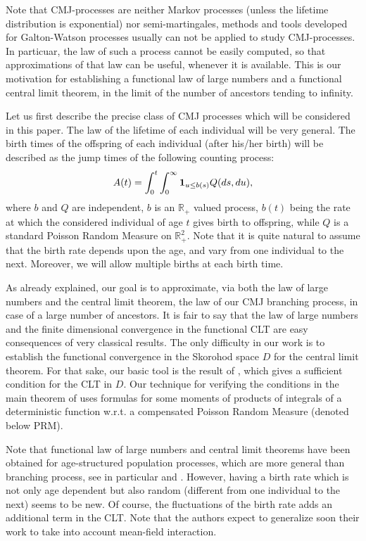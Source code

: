 \documentclass[11pt]{article}
\def\R{{\mathbb R}}
\begin{document}
Note that CMJ-processes are neither Markov processes (unless the lifetime distribution is exponential) nor semi-martingales, methods and tools developed for Galton-Watson processes usually can not be applied to study CMJ-processes. In particuar, the law of such a process cannot be easily computed, so that approximations of that law can be useful, whenever it is available.  This is our motivation for establishing  a functional law of large numbers and a functional central limit theorem, in the limit of the number of ancestors tending to infinity.   

Let us first describe the precise class of CMJ processes which will be considered in this paper. The law of the lifetime of each individual will be very general. The birth times of the offspring of each individual (after his/her birth) will be described as the jump times of the following counting process:
\[ A(t)=\int_0^t\int_0^\infty{\bf1}_{u\le b(s)}Q(ds,du),\]
where $b$ and $Q$ are independent, $b$ is an $\R_+$ valued process, $b(t)$ being the rate at which the considered individual of age $t$ gives birth to offspring, while $Q$ is a standard Poisson Random Measure on $\R_+^2$. Note that it is quite natural to assume that the birth rate depends upon the age, and vary from one individual to the next. Moreover, we will allow multiple births  at each birth time. 

As already explained, our goal is to approximate, via both the law of large numbers and the central limit theorem,
the law of our CMJ branching process, in case of a large number of ancestors. It is fair to say that the law of large numbers and the finite dimensional convergence in the functional CLT are easy consequences of very classical results. The only
difficulty in our work is to establish the functional convergence in the Skorohod space $D$ for the central limit theorem.  For that sake, our basic tool is the result of \cite{MH}, which gives a sufficient condition for the CLT in $D$. Our technique for verifying the conditions in the main theorem of \cite{MH} uses formulas for some moments of products of integrals of a deterministic function w.r.t. a compensated Poisson Random Measure (denoted below PRM).  

Note that functional law of large numbers and central limit theorems have been obtained for age-structured population processes, which are more general than branching process, see in particular \cite{Oels} and \cite{FJSwang}. However, having a birth rate which is not only age dependent but also random (different from one individual to the next) seems to be new. Of course, the fluctuations of the birth rate adds an additional term in the CLT. Note that the authors expect to generalize soon their work to take into account mean-field interaction.
\end{document}
